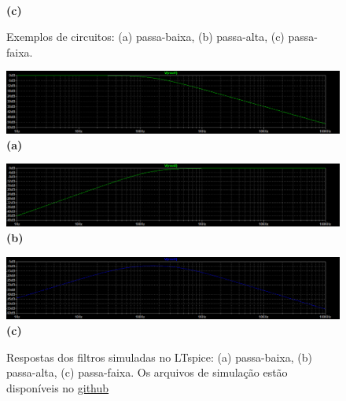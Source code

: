 \begin{figure}[h!]
\begin{minipage}[b]{0.49\linewidth}
        \centering
        \\ \textbf{(c)}
    \end{minipage}
    \caption{Exemplos de circuitos: (a) passa-baixa, (b) passa-alta, (c) passa-faixa.}
    \label{fig:filtros_reais}
\end{figure}

\begin{figure}[h!]
    \centering
    \begin{minipage}[b]{0.9\linewidth}
        \includegraphics[width=\linewidth]{figuras/LT_pb.png}
        \centering
        \\ \textbf{(a)}
    \end{minipage}
    \begin{minipage}[b]{0.9\linewidth}
        \includegraphics[width=\linewidth]{figuras/LT_pa.png}
        \centering
        \\ \textbf{(b)}
    \end{minipage}
    \begin{minipage}[b]{0.9\linewidth}     
        \includegraphics[width=\linewidth]{figuras/LT_pf.png}
        \centering
        \\ \textbf{(c)}
    \end{minipage}
    \caption{Respostas dos filtros simuladas no LTspice: (a) passa-baixa, (b) passa-alta, (c) passa-faixa. Os arquivos de simulação estão disponíveis no \href{https://github.com/David1340/Apostila-Filtros-Ativos/tree/main/LTspice}{github}}
    \label{fig:LT_circuitos}
\end{figure}